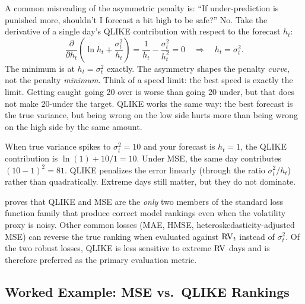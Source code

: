 \begin{intuition}
A common misreading of the asymmetric penalty is: ``If under-prediction is punished more, shouldn't I forecast a bit high to be safe?''
No.
Take the derivative of a single day's QLIKE contribution with respect to the forecast $h_t$:
\[
\frac{\partial}{\partial h_t}\left(\ln h_t + \frac{\sigma^2_t}{h_t}\right) = \frac{1}{h_t} - \frac{\sigma^2_t}{h_t^2} = 0 \quad \Longrightarrow \quad h_t = \sigma^2_t.
\]
The minimum is at $h_t = \sigma^2_t$ exactly.
The asymmetry shapes the penalty \emph{curve}, not the penalty \emph{minimum}.
Think of a speed limit: the best speed is exactly the limit.
Getting caught going 20 over is worse than going 20 under, but that does not make 20-under the target.
QLIKE works the same way: the best forecast is the true variance, but being wrong on the low side hurts more than being wrong on the high side by the same amount.
\end{intuition}

\begin{intuition}
When true variance spikes to $\sigma^2_t = 10$ and your forecast is $h_t = 1$, the QLIKE contribution is $\ln(1) + 10/1 = 10$.
Under MSE, the same day contributes $(10 - 1)^2 = 81$.
QLIKE penalizes the error linearly (through the ratio $\sigma^2_t / h_t$) rather than quadratically.
Extreme days still matter, but they do not dominate.
\end{intuition}

\begin{keyresult}
\citet{Patton2011} proves that QLIKE and MSE are the \emph{only} two members of the standard loss function family that produce correct model rankings even when the volatility proxy is noisy.
Other common losses (MAE, HMSE, heteroskedasticity-adjusted MSE) can reverse the true ranking when evaluated against $\operatorname{RV}_t$ instead of $\sigma^2_t$.
Of the two robust losses, QLIKE is less sensitive to extreme $\operatorname{RV}$ days and is therefore preferred as the primary evaluation metric.
\end{keyresult}

\subsection{Worked Example: MSE vs.\ QLIKE Rankings}

